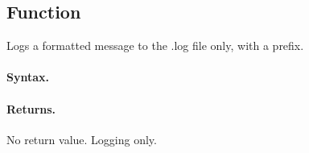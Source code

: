 \subsection{Function }
\label{sub:function_utils_wlog}

Logs a formatted message to the .log file only, with a  prefix.

\paragraph{Syntax.}
\begin{center}
\end{center}

\paragraph{Returns.}
No return value. Logging only.
\endinput

